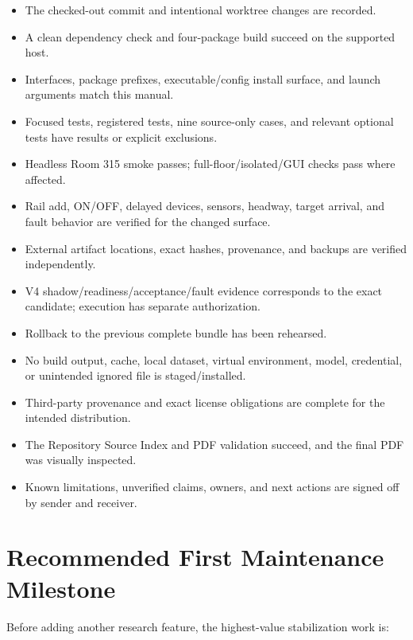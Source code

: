 \begin{procedurebox}
\begin{itemize}
  \item[$\square$] The checked-out commit and intentional worktree changes are recorded.
  \item[$\square$] A clean dependency check and four-package build succeed on the supported host.
  \item[$\square$] Interfaces, package prefixes, executable/config install surface, and launch arguments match this manual.
  \item[$\square$] Focused tests, registered tests, nine source-only cases, and relevant optional tests have results or explicit exclusions.
  \item[$\square$] Headless Room 315 smoke passes; full-floor/isolated/GUI checks pass where affected.
  \item[$\square$] Rail add, ON/OFF, delayed devices, sensors, headway, target arrival, and fault behavior are verified for the changed surface.
  \item[$\square$] External artifact locations, exact hashes, provenance, and backups are verified independently.
  \item[$\square$] V4 shadow/readiness/acceptance/fault evidence corresponds to the exact candidate; execution has separate authorization.
  \item[$\square$] Rollback to the previous complete bundle has been rehearsed.
  \item[$\square$] No build output, cache, local dataset, virtual environment, model, credential, or unintended ignored file is staged/installed.
  \item[$\square$] Third-party provenance and exact license obligations are complete for the intended distribution.
  \item[$\square$] The Repository Source Index and PDF validation succeed, and the final PDF was visually inspected.
  \item[$\square$] Known limitations, unverified claims, owners, and next actions are signed off by sender and receiver.
\end{itemize}
\end{procedurebox}

\section{Recommended First Maintenance Milestone}

Before adding another research feature, the highest-value stabilization work is:

